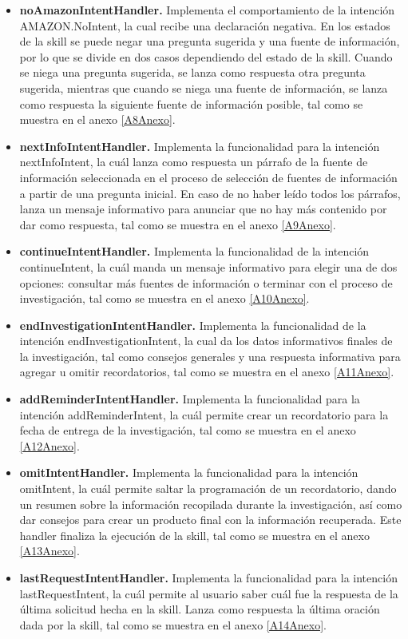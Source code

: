 \begin{itemize}
  \item \textbf{noAmazonIntentHandler.} Implementa el comportamiento de la intención AMAZON.NoIntent, la cual recibe una declaración negativa. En los estados de la skill se puede negar una pregunta sugerida y una fuente de información, por lo que se divide en dos casos dependiendo del estado de la skill. Cuando se niega una pregunta sugerida, se lanza como respuesta otra pregunta sugerida, mientras que cuando se niega una fuente de información, se lanza como respuesta la siguiente fuente de información posible, tal como se muestra en el anexo \ref{A8Anexo}.
  \item \textbf{nextInfoIntentHandler.} Implementa la funcionalidad para la intención nextInfoIntent, la cuál lanza como respuesta un párrafo de la fuente de información seleccionada en el proceso de selección de fuentes de información a partir de una pregunta inicial. En caso de no haber leído todos los párrafos, lanza un mensaje informativo para anunciar que no hay más contenido por dar como respuesta, tal como se muestra en el anexo \ref{A9Anexo}.
  \item \textbf{continueIntentHandler.} Implementa la funcionalidad de la intención continueIntent, la cuál manda un mensaje informativo para elegir una de dos opciones: consultar más fuentes de información o terminar con el proceso de investigación, tal como se muestra en el anexo \ref{A10Anexo}.
  \item \textbf{endInvestigationIntentHandler.} Implementa la funcionalidad de la intención endInvestigationIntent, la cual da los datos informativos finales de la investigación, tal como consejos generales y una respuesta informativa para agregar u omitir recordatorios, tal como se muestra en el anexo \ref{A11Anexo}.
  \item \textbf{addReminderIntentHandler.} Implementa la funcionalidad para la intención addReminderIntent, la cuál permite crear un recordatorio para la fecha de entrega de la investigación, tal como se muestra en el anexo \ref{A12Anexo}.
  \item \textbf{omitIntentHandler.} Implementa la funcionalidad para la intención omitIntent, la cuál permite saltar la programación de un recordatorio, dando un resumen sobre la información recopilada durante la investigación, así como dar consejos para crear un producto final con la información recuperada. Este handler finaliza la ejecución de la skill, tal como se muestra en el anexo \ref{A13Anexo}.
  \item \textbf{lastRequestIntentHandler.} Implementa la funcionalidad para la intención lastRequestIntent, la cuál permite al usuario saber cuál fue la respuesta de la última solicitud hecha en la skill. Lanza como respuesta la última oración dada por la skill, tal como se muestra en el anexo \ref{A14Anexo}.
\end{itemize}

